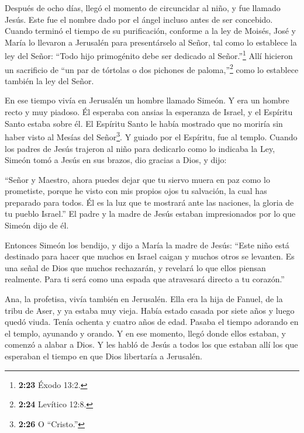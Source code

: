  Después de ocho días, llegó el momento de circuncidar al
niño, y fue llamado Jesús. Este fue el nombre dado por el ángel incluso
antes de ser concebido.  Cuando terminó el tiempo de su
purificación, conforme a la ley de Moisés, José y María lo llevaron a
Jerusalén para presentárselo al Señor,  tal como lo
establece la ley del Señor: ``Todo hijo primogénito debe ser dedicado al
Señor.''\footnote{\textbf{2:23} Éxodo 13:2.}  Allí hicieron
un sacrificio de ``un par de tórtolas o dos pichones de
paloma,''\footnote{\textbf{2:24} Levítico 12:8.} como lo establece
también la ley del Señor.

 En ese tiempo vivía en Jerusalén un hombre llamado Simeón.
Y era un hombre recto y muy piadoso. Él esperaba con ansias la esperanza
de Israel, y el Espíritu Santo estaba sobre él.  El
Espíritu Santo le había mostrado que no moriría sin haber visto al
Mesías del Señor\footnote{\textbf{2:26} O ``Cristo.''}.  Y
guiado por el Espíritu, fue al templo. Cuando los padres de Jesús
trajeron al niño para dedicarlo como lo indicaba la Ley, 
Simeón tomó a Jesús en sus brazos, dio gracias a Dios, y dijo:

 ``Señor y Maestro, ahora puedes dejar que tu siervo muera
en paz como lo prometiste,  porque he visto con mis propios
ojos tu salvación,  la cual has preparado para todos.
 Él es la luz que te mostrará ante las naciones, la gloria
de tu pueblo Israel.''  El padre y la madre de Jesús
estaban impresionados por lo que Simeón dijo de él.

 Entonces Simeón los bendijo, y dijo a María la madre de
Jesús: ``Este niño está destinado para hacer que muchos en Israel caigan
y muchos otros se levanten. Es una señal de Dios que muchos rechazarán,
 y revelará lo que ellos piensan realmente. Para ti será
como una espada que atravesará directo a tu corazón.''

 Ana, la profetisa, vivía también en Jerusalén. Ella era la
hija de Fanuel, de la tribu de Aser, y ya estaba muy vieja. Había estado
casada por siete años  y luego quedó viuda. Tenía ochenta y
cuatro años de edad. Pasaba el tiempo adorando en el templo, ayunando y
orando.  Y en ese momento, llegó donde ellos estaban, y
comenzó a alabar a Dios. Y les habló de Jesús a todos los que estaban
allí los que esperaban el tiempo en que Dios libertaría a Jerusalén.

